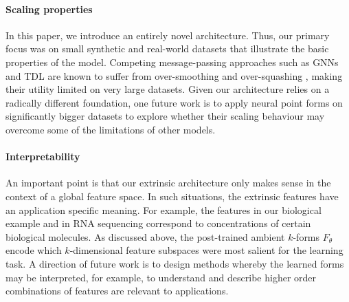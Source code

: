 \documentclass{article}
\newcommand{\bruno}[1]{}
\newcommand{\jake}[1]{}
\theoremstyle{remark}
\theoremstyle{plain}
\begin{document}
\paragraph{Scaling properties} In this paper, we introduce an entirely novel architecture. Thus, our primary focus was on small synthetic and real-world datasets that illustrate the basic properties of the model. Competing message-passing approaches such as GNNs and TDL are known to suffer from over-smoothing \citep{li2018deeper,oono2019graph,cai2020note,rusch2023survey} and over-squashing \citep{alon2021bottleneck,topping2022understanding,di2023over}, making their utility limited on very large datasets. Given our architecture relies on a radically different foundation, one future work is to apply neural point forms on significantly bigger datasets to explore whether their scaling behaviour may overcome some of the limitations of other models. 

\paragraph{Interpretability} An important point is that our extrinsic architecture only makes sense in the context of a global feature space. In such situations, the extrinsic features have an application specific meaning. For example, the features in our biological example and in RNA sequencing correspond to concentrations of certain biological molecules. As discussed above, the post-trained ambient $k$-forms $F_\theta$ encode which $k$-dimensional feature subspaces were most salient for the learning task. A direction of future work is to design methods whereby the learned forms may be interpreted, for example, to understand and describe higher order combinations of features are relevant to applications. 



\end{document}
